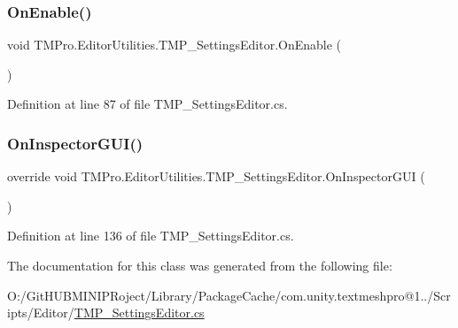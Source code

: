 \subsubsection{\texorpdfstring{OnEnable()}{OnEnable()}}
{\footnotesize\ttfamily void T\+M\+Pro.\+Editor\+Utilities.\+T\+M\+P\+\_\+\+Settings\+Editor.\+On\+Enable (\begin{DoxyParamCaption}{ }\end{DoxyParamCaption})}



Definition at line 87 of file T\+M\+P\+\_\+\+Settings\+Editor.\+cs.

\mbox{\label{class_t_m_pro_1_1_editor_utilities_1_1_t_m_p___settings_editor_a11891e45e7299c16ee2cf20b420d09b1}} 
\subsubsection{\texorpdfstring{OnInspectorGUI()}{OnInspectorGUI()}}
{\footnotesize\ttfamily override void T\+M\+Pro.\+Editor\+Utilities.\+T\+M\+P\+\_\+\+Settings\+Editor.\+On\+Inspector\+G\+UI (\begin{DoxyParamCaption}{ }\end{DoxyParamCaption})}



Definition at line 136 of file T\+M\+P\+\_\+\+Settings\+Editor.\+cs.



The documentation for this class was generated from the following file\+:\begin{DoxyCompactItemize}
\item 
O\+:/\+Git\+H\+U\+B\+M\+I\+N\+I\+P\+Roject/\+Library/\+Package\+Cache/com.\+unity.\+textmeshpro@1../\+Scripts/\+Editor/\mbox{\hyperlink{_t_m_p___settings_editor_8cs}{T\+M\+P\+\_\+\+Settings\+Editor.\+cs}}\end{DoxyCompactItemize}
